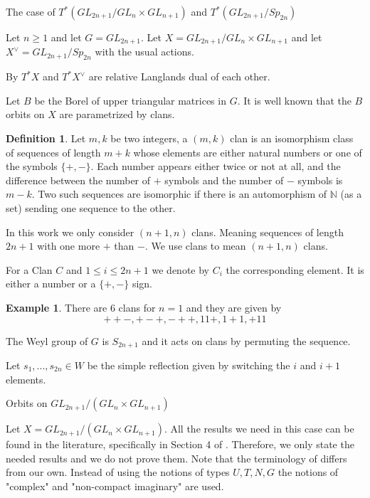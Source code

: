 \documentclass[12pt]{article}
\newcommand{\N}{\mathbb{N}}
\theoremstyle{plain}
\theoremstyle{definition}
\newtheorem{defn}[theorem]{Definition}
\newtheorem{exmp}[theorem]{Example}
\begin{document}
\begin{subsection}{The case of $T^*(GL_{2n+1}/GL_n\times GL_{n+1})$ and $T^*(GL_{2n+1}/Sp_{2n})$}

Let $n\geq 1$ and let $G=GL_{2n+1}$. Let $X=GL_{2n+1}/GL_n\times GL_{n+1}$ and let $X^\vee=GL_{2n+1}/Sp_{2n}$ with the usual actions.

    By \cite{benzvi2024relativelanglandsduality} $T^*X$ and $T^*X^\vee$ are relative Langlands dual of each other.

Let $B$ be the Borel of upper triangular matrices in $G$. It is well known that the $B$ orbits on $X$ are parametrized by clans. 

\begin{defn}
    Let $m,k$ be two integers, a $(m,k)$ clan is an isomorphism class of sequences of length $m+k$ whose elements are either natural numbers or one of the symbols $\{+,-\}$. Each number appears either twice or not at all, and the difference between the number of $+$ symbols and the number of $-$ symbols is $m-k$. Two such sequences are isomorphic if there is an automorphism of $\N$ (as a set) sending one sequence to the other.

    In this work we only consider $(n+1,n)$ clans. Meaning sequences of length $2n+1$ with one more $+$ than $-$. We use clans to mean $(n+1,n)$ clans.

    For a Clan $C$ and $1\leq i\leq 2n+1$ we denote by $C_i$ the corresponding element. It is either a number or a $\{+,-\}$ sign.
\end{defn}

\begin{exmp}
    There are 6 clans for $n=1$ and they  are given by $$++-,+-+,-++,11+,1+1,+11$$
\end{exmp}

The Weyl group of $G$ is $S_{2n+1}$ and it acts on clans by permuting the sequence.

Let $s_1,...,s_{2n}\in W$ be the simple reflection given by switching the $i$ and $i+1$ elements.

\begin{subsubsection}{Orbits on $GL_{2n+1}/(GL_n\times GL_{n+1})$}

Let $X=GL_{2n+1}/(GL_n\times GL_{n+1})$. All the results we need in this case can be found in the literature, specifically in Section 4 of \cite{wyser2012glpxglqorbitclosures}. Therefore, we only state the needed results and we do not prove them. Note that the terminology of \cite{wyser2012glpxglqorbitclosures} differs from our own. Instead of using the notions of types $U,T,N,G$ the notions of "complex" and "non-compact imaginary" are used.


\end{subsubsection}
\end{subsection}
\end{document}
